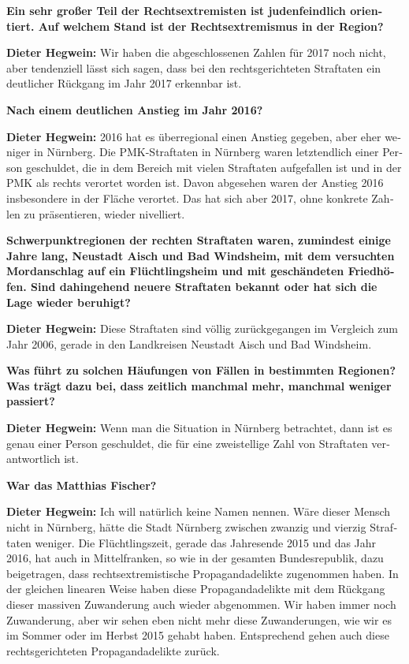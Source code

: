 \begin{otherlanguage}{ngerman}
\textbf{Ein sehr großer Teil der Rechtsextremisten ist judenfeindlich orientiert. Auf welchem Stand ist der Rechtsextremismus in der Region?}

\textbf{Dieter Hegwein:} Wir haben die abgeschlossenen Zahlen für 2017 noch nicht, aber tendenziell lässt sich sagen, dass bei den rechtsgerichteten Straftaten ein deutlicher Rückgang im Jahr 2017 erkennbar ist.

\textbf{Nach einem deutlichen Anstieg im Jahr 2016?}

\textbf{Dieter Hegwein:} 2016 hat es überregional einen Anstieg gegeben, aber eher weniger in Nürnberg. Die PMK-Straftaten in Nürnberg waren letztendlich einer Person geschuldet, die in dem Bereich mit vielen Straftaten aufgefallen ist und in der PMK als rechts verortet worden ist. Davon abgesehen waren der Anstieg 2016 insbesondere in der Fläche verortet. Das hat sich aber 2017, ohne konkrete Zahlen zu präsentieren, wieder nivelliert.

\textbf{Schwerpunktregionen der rechten Straftaten waren, zumindest einige Jahre lang, Neustadt Aisch und Bad Windsheim, mit dem versuchten Mordanschlag auf ein Flüchtlingsheim und mit geschändeten Friedhöfen. Sind dahingehend neuere Straftaten bekannt oder hat sich die Lage wieder beruhigt?}

\textbf{Dieter Hegwein:} Diese Straftaten sind völlig zurückgegangen im Vergleich zum Jahr 2006, gerade in den Landkreisen Neustadt Aisch und Bad Windsheim.

\textbf{Was führt zu solchen Häufungen von Fällen in bestimmten Regionen? Was trägt dazu bei, dass zeitlich manchmal mehr, manchmal weniger passiert?}

\textbf{Dieter Hegwein:} Wenn man die Situation in Nürnberg betrachtet, dann ist es genau einer Person geschuldet, die für eine zweistellige Zahl von Straftaten verantwortlich ist. 

\textbf{War das Matthias Fischer? }

\textbf{Dieter Hegwein:} Ich will natürlich keine Namen nennen. Wäre dieser Mensch nicht in Nürnberg, hätte die Stadt Nürnberg zwischen zwanzig und vierzig Straftaten weniger. Die Flüchtlingszeit, gerade das Jahresende 2015 und das Jahr 2016, hat auch in Mittelfranken, so wie in der gesamten Bundesrepublik, dazu beigetragen, dass rechtsextremistische Propagandadelikte zugenommen haben. In der gleichen linearen Weise haben diese Propagandadelikte mit dem Rückgang dieser massiven Zuwanderung auch wieder abgenommen. Wir haben immer noch Zuwanderung, aber wir sehen eben nicht mehr diese Zuwanderungen, wie wir es im Sommer oder im Herbst 2015 gehabt haben. Entsprechend gehen auch diese rechtsgerichteten Propagandadelikte zurück.


\end{otherlanguage}
